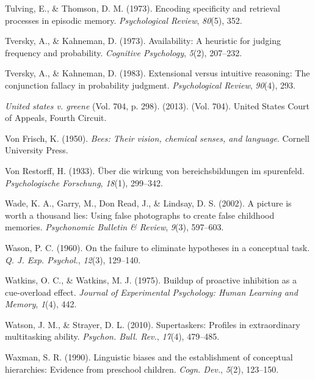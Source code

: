 \documentclass[
]{krantz}
\newlength{\cslhangindent}
\newlength{\cslentryspacingunit} %
\newenvironment{CSLReferences}[2] %
 {%
  \setlength{\parindent}{0pt}
  \ifodd #1
  \let\oldpar\par
  \def\par{\hangindent=\cslhangindent\oldpar}
  \fi
  \setlength{\parskip}{#2\cslentryspacingunit}
 }%
 {}
\begin{document}
\begin{CSLReferences}{1}{0}
\leavevmode{}%
Tulving, E., \& Thomson, D. M. (1973). Encoding specificity and retrieval processes in episodic memory. \emph{Psychological Review}, \emph{80}(5), 352.

\leavevmode{}%
Tversky, A., \& Kahneman, D. (1973). Availability: A heuristic for judging frequency and probability. \emph{Cognitive Psychology}, \emph{5}(2), 207--232.

\leavevmode{}%
Tversky, A., \& Kahneman, D. (1983). Extensional versus intuitive reasoning: The conjunction fallacy in probability judgment. \emph{Psychological Review}, \emph{90}(4), 293.

\leavevmode{}%
\emph{United states v. greene} (Vol. 704, p. 298). (2013). (Vol. 704). United States Court of Appeals, Fourth Circuit.

\leavevmode{}%
Von Frisch, K. (1950). \emph{Bees: Their vision, chemical senses, and language}. Cornell University Press.

\leavevmode{}%
Von Restorff, H. (1933). {Ü}ber die wirkung von bereichsbildungen im spurenfeld. \emph{Psychologische Forschung}, \emph{18}(1), 299--342.

\leavevmode{}%
Wade, K. A., Garry, M., Don Read, J., \& Lindsay, D. S. (2002). A picture is worth a thousand lies: Using false photographs to create false childhood memories. \emph{Psychonomic Bulletin \& Review}, \emph{9}(3), 597--603.

\leavevmode{}%
Wason, P. C. (1960). On the failure to eliminate hypotheses in a conceptual task. \emph{Q. J. Exp. Psychol.}, \emph{12}(3), 129--140.

\leavevmode{}%
Watkins, O. C., \& Watkins, M. J. (1975). Buildup of proactive inhibition as a cue-overload effect. \emph{Journal of Experimental Psychology: Human Learning and Memory}, \emph{1}(4), 442.

\leavevmode{}%
Watson, J. M., \& Strayer, D. L. (2010). Supertaskers: Profiles in extraordinary multitasking ability. \emph{Psychon. Bull. Rev.}, \emph{17}(4), 479--485.

\leavevmode{}%
Waxman, S. R. (1990). Linguistic biases and the establishment of conceptual hierarchies: Evidence from preschool children. \emph{Cogn. Dev.}, \emph{5}(2), 123--150.


\end{CSLReferences}
\end{document}
